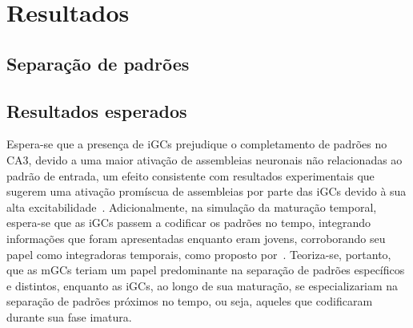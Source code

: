 \chapter{Resultados}

\section{Separação de padrões}


\section{Resultados esperados}

Espera-se que a presença de iGCs prejudique o completamento de padrões no CA3, devido a uma maior ativação de assembleias
neuronais não relacionadas ao padrão de entrada, um efeito consistente com resultados experimentais que sugerem uma ativação
promíscua de assembleias por parte das iGCs devido à sua alta excitabilidade~\cite{koSystems2025}. Adicionalmente, na simulação da
maturação temporal, espera-se que as iGCs passem a codificar os padrões no tempo, integrando informações que foram apresentadas
enquanto eram jovens, corroborando seu papel como integradoras temporais, como proposto por~\cite{aimoneComputational2009}.
Teoriza-se, portanto, que as mGCs teriam um papel predominante na separação de padrões específicos e distintos, enquanto as iGCs,
ao longo de sua maturação, se especializariam na separação de padrões próximos no tempo, ou seja, aqueles que codificaram durante
sua fase imatura.
